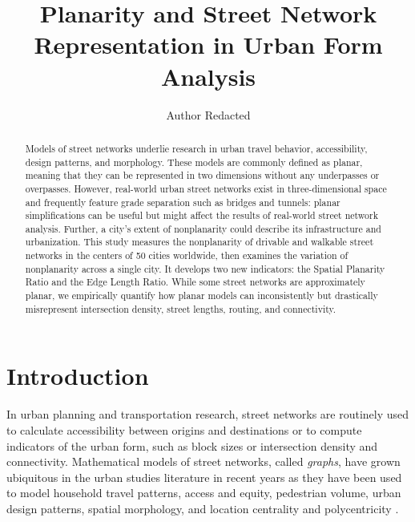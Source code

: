 \documentclass[Afour,sageh,times]{sagej}
\begin{document}
\title{Planarity and Street Network Representation in Urban Form Analysis}
\author{Author Redacted}



\begin{abstract}

Models of street networks underlie research in urban travel behavior, accessibility, design patterns, and morphology. These models are commonly defined as planar, meaning that they can be represented in two dimensions without any underpasses or overpasses. However, real-world urban street networks exist in three-dimensional space and frequently feature grade separation such as bridges and tunnels: planar simplifications can be useful but might affect the results of real-world street network analysis. Further, a city's extent of nonplanarity could describe its infrastructure and urbanization. This study measures the nonplanarity of drivable and walkable street networks in the centers of 50 cities worldwide, then examines the variation of nonplanarity across a single city. It develops two new indicators: the Spatial Planarity Ratio and the Edge Length Ratio. While some street networks are approximately planar, we empirically quantify how planar models can inconsistently but drastically misrepresent intersection density, street lengths, routing, and connectivity.

\end{abstract}


\maketitle



\section{Introduction}

In urban planning and transportation research, street networks are routinely used to calculate accessibility between origins and destinations or to compute indicators of the urban form, such as block sizes or intersection density and connectivity. Mathematical models of street networks, called \emph{graphs}, have grown ubiquitous in the urban studies literature in recent years as they have been used to model household travel patterns, access and equity, pedestrian volume, urban design patterns, spatial morphology, and location centrality and polycentricity \citep{marshall_street_2010,pflieger_switzerland_2010,porta_street_2012,lee_identifying_2014,porta_alterations_2014,marshall_community_2014,hajrasouliha_impact_2015,parthasarathi_street_2015,knight_metrics_2015,xiao_identifying_2016,zhong_revealing_2017}.
\end{document}
